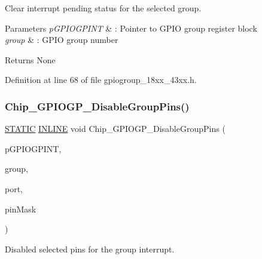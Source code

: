 Clear interrupt pending status for the selected group. 


\begin{DoxyParams}{Parameters}
{\em p\+G\+P\+I\+O\+G\+P\+I\+NT} & \+: Pointer to G\+P\+IO group register block \\
\hline
{\em group} & \+: G\+P\+IO group number \\
\hline
\end{DoxyParams}
\begin{DoxyReturn}{Returns}
None 
\end{DoxyReturn}


Definition at line 68 of file gpiogroup\+\_\+18xx\+\_\+43xx.\+h.

\mbox{\label{group___g_p_i_o_g_p__18_x_x__43_x_x_gac23132a059cba44f07718b6d3fe38a3f}} 
\subsubsection{\texorpdfstring{Chip\+\_\+\+G\+P\+I\+O\+G\+P\+\_\+\+Disable\+Group\+Pins()}{Chip\_GPIOGP\_DisableGroupPins()}}
{\footnotesize\ttfamily \hyperlink{group___l_p_c___types___public___macros_ga10b2d890d871e1489bb02b7e70d9bdfb}{S\+T\+A\+T\+IC} \hyperlink{spifi__18xx__43xx_8h_a2eb6f9e0395b47b8d5e3eeae4fe0c116}{I\+N\+L\+I\+NE} void Chip\+\_\+\+G\+P\+I\+O\+G\+P\+\_\+\+Disable\+Group\+Pins (\begin{DoxyParamCaption}\item[{\hyperlink{struct_l_p_c___g_p_i_o_g_r_o_u_p_i_n_t___t}{L\+P\+C\+\_\+\+G\+P\+I\+O\+G\+R\+O\+U\+P\+I\+N\+T\+\_\+T} $\ast$}]{p\+G\+P\+I\+O\+G\+P\+I\+NT,  }\item[{uint8\+\_\+t}]{group,  }\item[{uint8\+\_\+t}]{port,  }\item[{uint32\+\_\+t}]{pin\+Mask }\end{DoxyParamCaption})}



Disabled selected pins for the group interrupt. 



